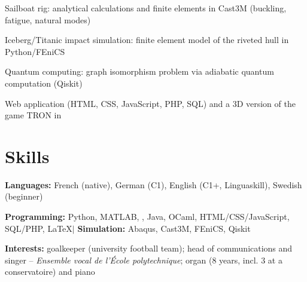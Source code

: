 \documentclass[10pt]{article}
\begin{document}
    \bulletsep
    \begin{onecolentry}
        \begin{highlights}
            \item Sailboat rig: analytical calculations and finite elements in Cast3M (buckling, fatigue, natural modes)
            \item Iceberg/Titanic impact simulation: finite element model of the riveted hull in Python/FEniCS
            \item Quantum computing: graph isomorphism problem via adiabatic quantum computation (Qiskit)
            \item Web application (HTML, CSS, JavaScript, PHP, SQL) and a 3D version of the game TRON in \cpp
        \end{highlights}
    \end{onecolentry}


\section{Skills}

    \begin{onecolentry}
        \textbf{Languages:} French (native), German (C1), English (C1+, Linguaskill), Swedish (beginner)
    \end{onecolentry}

    \bulletsep

    \begin{onecolentry}
        \textbf{Programming:} Python, MATLAB, \cpp, Java, OCaml, HTML/CSS/JavaScript, SQL/PHP, \LaTeX \quad $|$ \quad \textbf{Simulation:} Abaqus, Cast3M, FEniCS, Qiskit
    \end{onecolentry}

    \bulletsep

    \begin{onecolentry}
        \textbf{Interests:} goalkeeper (university football team); head of communications and singer -- \textit{Ensemble vocal de l'École polytechnique}; organ (8 years, incl. 3 at a conservatoire) and piano
    \end{onecolentry}
\end{document}
